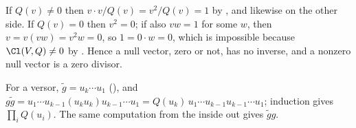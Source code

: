 If $Q(v) \ne 0$ then $v \cdot v/Q(v) = v^{2}/Q(v) = 1$ by , and likewise on the other side. If $Q(v) = 0$ then $v^{2} = 0$; if also $vw = 1$ for some $w$, then $v = v(vw) = v^{2} w = 0$, so $1 = 0 \cdot w = 0$, which is impossible because $\Cl(V, Q) \ne 0$ by . Hence a null vector, zero or not, has no inverse, and a nonzero null vector is a zero divisor.

For a versor, $\tilde{g} = u_k \cdots u_1$ (), and $g \tilde{g} = u_1 \cdots u_{k-1} (u_k u_k) u_{k-1} \cdots u_1 = Q(u_k)\, u_1 \cdots u_{k-1} u_{k-1} \cdots u_1$; induction gives $\prod_i Q(u_i)$. The same computation from the inside out gives $\tilde{g} g$.
